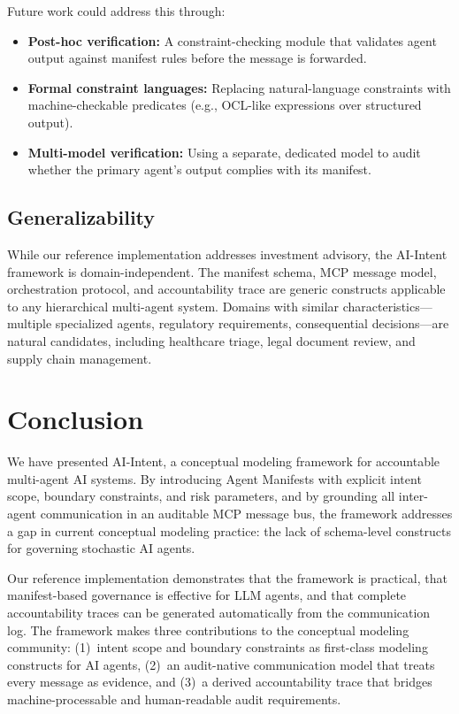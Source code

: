 \documentclass[runningheads]{llncs}
\begin{document}
Future work could address this through:
\begin{itemize}
    \item \textbf{Post-hoc verification:} A constraint-checking module that validates agent output against manifest rules before the message is forwarded.
    \item \textbf{Formal constraint languages:} Replacing natural-language constraints with machine-checkable predicates (e.g., OCL-like expressions over structured output).
    \item \textbf{Multi-model verification:} Using a separate, dedicated model to audit whether the primary agent's output complies with its manifest.
\end{itemize}

\subsection{Generalizability}

While our reference implementation addresses investment advisory, the AI-Intent framework is domain-independent. The manifest schema, MCP message model, orchestration protocol, and accountability trace are generic constructs applicable to any hierarchical multi-agent system. Domains with similar characteristics---multiple specialized agents, regulatory requirements, consequential decisions---are natural candidates, including healthcare triage, legal document review, and supply chain management.

\section{Conclusion}
\label{sec:conclusion}

We have presented AI-Intent, a conceptual modeling framework for accountable multi-agent AI systems. By introducing Agent Manifests with explicit intent scope, boundary constraints, and risk parameters, and by grounding all inter-agent communication in an auditable MCP message bus, the framework addresses a gap in current conceptual modeling practice: the lack of schema-level constructs for governing stochastic AI agents.

Our reference implementation demonstrates that the framework is practical, that manifest-based governance is effective for LLM agents, and that complete accountability traces can be generated automatically from the communication log. The framework makes three contributions to the conceptual modeling community: (1)~intent scope and boundary constraints as first-class modeling constructs for AI agents, (2)~an audit-native communication model that treats every message as evidence, and (3)~a derived accountability trace that bridges machine-processable and human-readable audit requirements.
\end{document}
